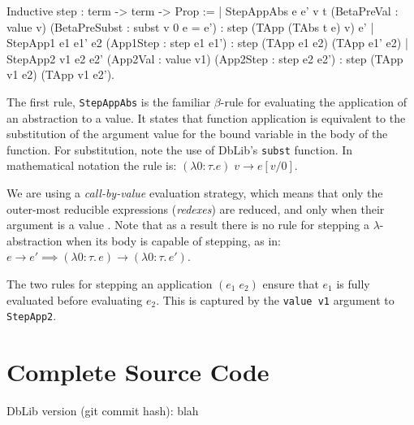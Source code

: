 \documentclass[]{unswthesis}
\let\c\texttt
\let\i\textit
\begin{document}
\begin{coqcode}
Inductive step : term -> term -> Prop :=
  | StepAppAbs e e' v t
      (BetaPreVal : value v)
      (BetaPreSubst : subst v 0 e = e') :
      step (TApp (TAbs t e) v) e'
  | StepApp1 e1 e1' e2
      (App1Step : step e1 e1') :
      step (TApp e1 e2) (TApp e1' e2)
  | StepApp2 v1 e2 e2'
      (App2Val : value v1)
      (App2Step : step e2 e2') :
      step (TApp v1 e2) (TApp v1 e2').
\end{coqcode}

The first rule, \c{StepAppAbs} is the familiar $\beta$-rule for evaluating the application of an abstraction to a value. It states that function application is equivalent to the substitution of the argument value for the bound variable in the body of the function. For substitution, note the use of DbLib's \c{subst} function. In mathematical notation the rule is: $(\lambda 0 : \tau. e) \; v \rightarrow e[v/0]$.

We are using a \i{call-by-value} evaluation strategy, which means that only the outer-most reducible expressions (\i{redexes}) are reduced, and only when their argument is a value \cite{tapl}. Note that as a result there is no rule for stepping a $\lambda$-abstraction when its body is capable of stepping, as in: $e \rightarrow e' \implies (\lambda 0 : \tau. \, e) \rightarrow (\lambda 0 : \tau. \, e')$.

The two rules for stepping an application $(e_1 \; e_2)$ ensure that $e_1$ is fully evaluated before evaluating $e_2$. This is captured by the \c{value v1} argument to \c{StepApp2}.

\section{Complete Source Code}
\label{sec:src}

DbLib version (git commit hash): blah
\end{document}
